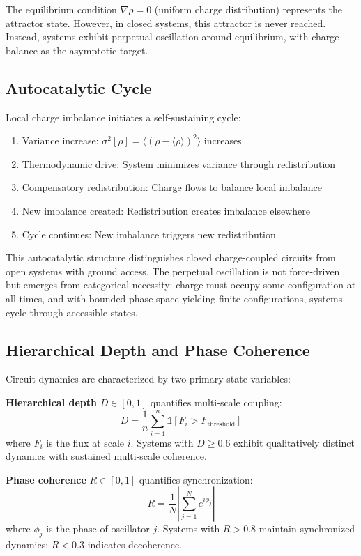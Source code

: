 \documentclass[12pt,a4paper]{article}
\theoremstyle{plain}
\theoremstyle{definition}
\theoremstyle{remark}
\begin{document}
The equilibrium condition $\nabla \rho = 0$ (uniform charge distribution) represents the attractor state. However, in closed systems, this attractor is never reached. Instead, systems exhibit perpetual oscillation around equilibrium, with charge balance as the asymptotic target.

\subsection{Autocatalytic Cycle}

Local charge imbalance initiates a self-sustaining cycle:
\begin{enumerate}
\item Variance increase: $\sigma^2[\rho] = \langle (\rho - \langle \rho \rangle)^2 \rangle$ increases
\item Thermodynamic drive: System minimizes variance through redistribution
\item Compensatory redistribution: Charge flows to balance local imbalance
\item New imbalance created: Redistribution creates imbalance elsewhere
\item Cycle continues: New imbalance triggers new redistribution
\end{enumerate}

This autocatalytic structure distinguishes closed charge-coupled circuits from open systems with ground access. The perpetual oscillation is not force-driven but emerges from categorical necessity: charge must occupy some configuration at all times, and with bounded phase space yielding finite configurations, systems cycle through accessible states.

\subsection{Hierarchical Depth and Phase Coherence}

Circuit dynamics are characterized by two primary state variables:

\textbf{Hierarchical depth} $D \in [0,1]$ quantifies multi-scale coupling:
\begin{equation}
D = \frac{1}{n} \sum_{i=1}^{n} \mathbb{1}[F_i > F_{\text{threshold}}]
\end{equation}
where $F_i$ is the flux at scale $i$. Systems with $D \geq 0.6$ exhibit qualitatively distinct dynamics with sustained multi-scale coherence.

\textbf{Phase coherence} $R \in [0,1]$ quantifies synchronization:
\begin{equation}
R = \frac{1}{N} \left| \sum_{j=1}^{N} e^{i\phi_j} \right|
\end{equation}
where $\phi_j$ is the phase of oscillator $j$. Systems with $R > 0.8$ maintain synchronized dynamics; $R < 0.3$ indicates decoherence.
\end{document}
